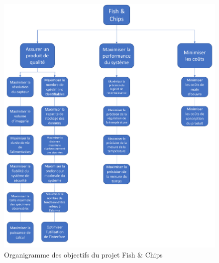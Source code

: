 \begin{enumerate}
    
    
    \newpage
    
    \begin{figure}
        \centering
        \includegraphics[width=1.0\linewidth]{fig/organigramme.pdf}
        \caption{Organigramme des objectifs du projet Fish \& Chips}
        \label{fig:organigramme}
    \end{figure}
    
    
\end{enumerate}
